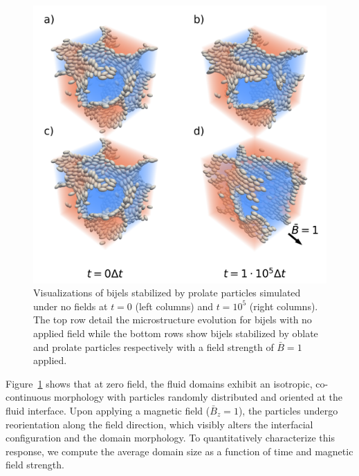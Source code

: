 \begin{figure} 
\centering 
\includegraphics[scale=0.5]{../figures/results/paper2/microstructure_viz-field_on.png} 
\caption{Visualizations of bijels stabilized by prolate particles simulated under no fields at $t = 0$ (left columns) and $t = 10^5$ (right columns). The top 
         row detail the microstructure evolution for bijels with no applied field while the bottom rows show bijels stabilized by oblate and prolate particles 
         respectively with a field strength of $\bar{B} = 1$ applied.}
\label{fig:microstructure_viz-field_on} 
\end{figure}

Figure~\ref{fig:microstructure_viz-field_on} shows that at zero field, the fluid domains exhibit an isotropic, co-continuous morphology with particles randomly 
distributed and oriented at the fluid interface. Upon applying a magnetic field (\(\bar{B}_z = 1\)), the particles undergo reorientation along the field direction, 
which visibly alters the interfacial configuration and the domain morphology. 
To quantitatively characterize this response, we compute the average domain size as a function of time and magnetic field strength. 

